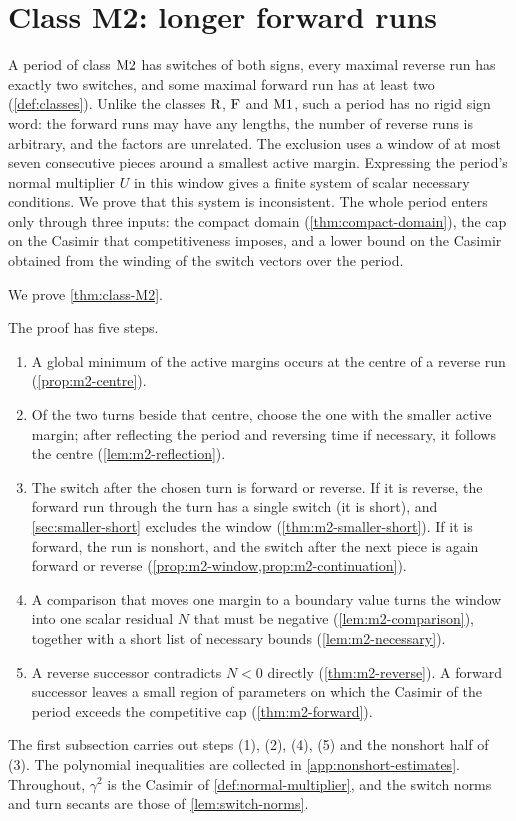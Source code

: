 \section{Class M2: longer forward runs}\label{sec:mixed}

A period of class $\mathrm{M2}$ has switches of both signs, every maximal reverse run has exactly two
switches, and some maximal forward run has at least two (\cref{def:classes}). Unlike the classes
$\mathrm{R}$, $\mathrm{F}$ and $\mathrm{M1}$, such a period has no rigid sign word: the forward runs may
have any lengths, the number of reverse runs is arbitrary, and the factors are unrelated. The
exclusion uses a window of at most seven consecutive pieces around a smallest active margin.
Expressing the period's normal multiplier $U$ in this window gives a finite system of scalar
necessary conditions. We prove that this system is inconsistent. The whole period enters only
through three inputs: the compact domain (\cref{thm:compact-domain}), the cap on the Casimir that
competitiveness imposes, and a lower bound on the Casimir obtained from the winding of the switch
vectors over the period.

We prove \cref{thm:class-M2}.

The proof has five steps.
\begin{enumerate}[label=(\arabic*)]
\item A global minimum of the active margins occurs at the centre of a reverse run
(\cref{prop:m2-centre}).
\item Of the two turns beside that centre, choose the one with the smaller active margin; after
reflecting the period and reversing time if necessary, it follows the centre
(\cref{lem:m2-reflection}).
\item The switch after the chosen turn is forward or reverse. If it is reverse, the forward run
through the turn has a single switch (it is short), and \cref{sec:smaller-short} excludes the
window (\cref{thm:m2-smaller-short}). If it is forward, the run is nonshort, and the switch after
the next piece is again forward or reverse (\cref{prop:m2-window,prop:m2-continuation}).
\item A comparison that moves one margin to a boundary value turns the window into one scalar
residual $N$ that must be negative (\cref{lem:m2-comparison}), together with a short list of
necessary bounds (\cref{lem:m2-necessary}).
\item A reverse successor contradicts $N<0$ directly (\cref{thm:m2-reverse}). A forward successor
leaves a small region of parameters on which the Casimir of the period exceeds the competitive cap
(\cref{thm:m2-forward}).
\end{enumerate}
The first subsection carries out steps (1), (2), (4), (5) and the nonshort half of (3). The polynomial
inequalities are collected in \cref{app:nonshort-estimates}. Throughout, $\gamma^2$ is the Casimir of
\cref{def:normal-multiplier}, and the switch norms and turn secants are those of
\cref{lem:switch-norms}.

